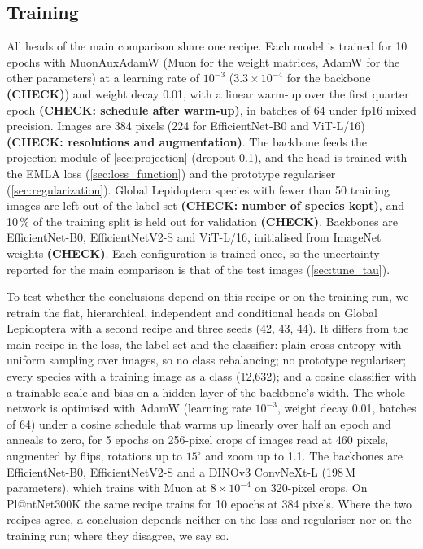 \subsection{Training}\label{sec:training}
All heads of the main comparison share one recipe.
Each model is trained for 10 epochs with MuonAuxAdamW (Muon for the weight matrices, AdamW for the other parameters) at a learning rate of $10^{-3}$ ($3.3\times10^{-4}$ for the backbone \textbf{(CHECK)}) and weight decay 0.01, with a linear warm-up over the first quarter epoch \textbf{(CHECK: schedule after warm-up)}, in batches of 64 under fp16 mixed precision.
Images are 384 pixels (224 for EfficientNet-B0 and ViT-L/16) \textbf{(CHECK: resolutions and augmentation)}.
The backbone feeds the projection module of \cref{sec:projection} (dropout 0.1), and the head is trained with the EMLA loss (\cref{sec:loss_function}) and the prototype regulariser (\cref{sec:regularization}).
Global Lepidoptera species with fewer than 50 training images are left out of the label set \textbf{(CHECK: number of species kept)}, and 10\,\% of the training split is held out for validation \textbf{(CHECK)}.
Backbones are EfficientNet-B0, EfficientNetV2-S and ViT-L/16, initialised from ImageNet weights \textbf{(CHECK)}.
Each configuration is trained once, so the uncertainty reported for the main comparison is that of the test images (\cref{sec:tune_tau}).

To test whether the conclusions depend on this recipe or on the training run, we retrain the flat, hierarchical, independent and conditional heads on Global Lepidoptera with a second recipe and three seeds (42, 43, 44).
It differs from the main recipe in the loss, the label set and the classifier: plain cross-entropy with uniform sampling over images, so no class rebalancing; no prototype regulariser; every species with a training image as a class (12,632); and a cosine classifier with a trainable scale and bias on a hidden layer of the backbone's width.
The whole network is optimised with AdamW (learning rate $10^{-3}$, weight decay 0.01, batches of 64) under a cosine schedule that warms up linearly over half an epoch and anneals to zero, for 5 epochs on 256-pixel crops of images read at 460 pixels, augmented by flips, rotations up to $15^\circ$ and zoom up to 1.1.
The backbones are EfficientNet-B0, EfficientNetV2-S and a DINOv3 ConvNeXt-L (198\,M parameters), which trains with Muon at $8\times10^{-4}$ on 320-pixel crops.
On Pl@ntNet300K the same recipe trains for 10 epochs at 384 pixels.
Where the two recipes agree, a conclusion depends neither on the loss and regulariser nor on the training run; where they disagree, we say so.
